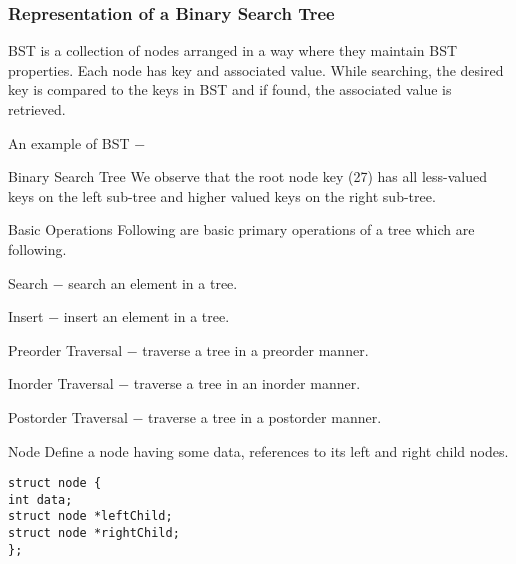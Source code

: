 \documentclass{beamer}
\begin{document}
\begin{frame}
\frametitle{Representation of a Binary Search Tree}
\large

BST is a collection of nodes arranged in a way where they maintain BST properties. Each node has key and associated value. While searching, the desired key is compared to the keys in BST and if found, the associated value is retrieved.

An example of BST −
\end{frame}
\begin{frame}
Binary Search Tree
We observe that the root node key (27) has all less-valued keys on the left sub-tree and higher valued keys on the right sub-tree.
\end{frame}
\begin{frame}
Basic Operations
Following are basic primary operations of a tree which are following.

Search − search an element in a tree.

Insert − insert an element in a tree.

Preorder Traversal − traverse a tree in a preorder manner.

Inorder Traversal − traverse a tree in an inorder manner.

Postorder Traversal − traverse a tree in a postorder manner.
\end{frame}
\begin{frame}[fragile]
Node
Define a node having some data, references to its left and right child nodes.
\begin{verbatim}
struct node {
int data;   
struct node *leftChild;
struct node *rightChild;
};
\end{verbatim}
\end{frame}
\end{document}
